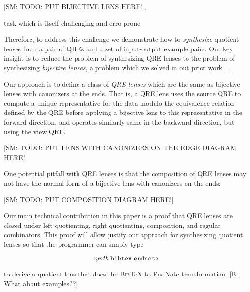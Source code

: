 \documentclass{svproc}
\newcommand{\FINISH}[3]{\ifdraft\textcolor{#1}{[#2: #3]}\fi}
\newcommand{\bcp}[1]{\FINISH{dkred}{B}{#1}}
\newcommand{\sam}[1]{\FINISH{dkpurple}{SM}{#1}}
\newcommand{\bibtex}{\textsc{Bib}\TeX{}}
\begin{document}
\sam{TODO: PUT BIJECTIVE LENS HERE!},

\noindent task which is itself challenging and erro-prone.

Therefore, to address this challenge we demonstrate how to {\em synthesize}
quotient lenses from a pair of QREs and a set of input-output example pairs. Our
key insight is to reduce the problem of synthesizing QRE lenses to the problem
of synthesizing {\em bijective lenses}, a problem which we solved in out prior
work ~\cite{popl18}.

Our approach is to define a class of {\em QRE lenses} which are the same as
bijective lenses with canonizers at the ends. That is, a QRE lens uses the
source QRE to compute a unique representative for the data modulo the
equivalence relation defined by the QRE before applying a bijective lens to
this representative in the forward direction, and operates similarly same in the
backward direction, but using the view QRE.

\sam{TODO: PUT LENS WITH CANONIZERS ON THE EDGE DIAGRAM HERE!}

One potential pitfall with QRE lenses is that the composition of QRE lenses may
not have the normal form of a bijective lens with canonizers on the ends:

\sam{TODO: PUT COMPOSITION DIAGRAM HERE!}

Our main technical contribution in this paper is a proof that QRE lenses are
closed under left quotienting, right quotienting, composition, and regular
combinators. This proof will allow justify our approach for synthesizing
quotient lenses so that the programmer can simply type

$$\mathit{synth} \; \verb!bibtex! \; \verb!endnote!$$

to derive a quotient lens that does the \bibtex{} to EndNote transformation.
\bcp{What about examples??}
\end{document}
